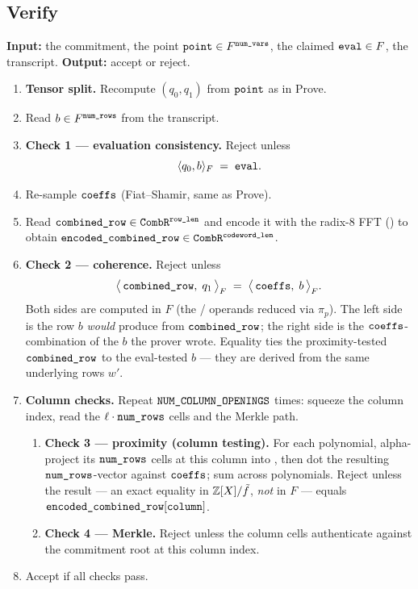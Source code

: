 \subsection{Verify}
\label{sec:verify}

\textbf{Input:} the commitment, the point
$\texttt{point} \in F^{\texttt{num\_vars}}$, the claimed
$\texttt{eval} \in F$, the transcript. \textbf{Output:} accept or
reject.

\begin{enumerate}
  \item \textbf{Tensor split.} Recompute $(q_0, q_1)$ from
    $\texttt{point}$ as in Prove.
  \item Read $b \in F^{\texttt{num\_rows}}$ from the transcript.
  \item \textbf{Check 1 --- evaluation consistency.} Reject unless
    \[
      \langle q_0, b\rangle_F \;=\; \texttt{eval}.
    \]
  \item Re-sample $\texttt{coeffs}$ (Fiat--Shamir, same as Prove).
  \item Read $\texttt{combined\_row} \in \texttt{CombR}^{\texttt{row\_len}}$
    and encode it with the radix-8 FFT () to obtain
    $\texttt{encoded\_combined\_row} \in
    \texttt{CombR}^{\texttt{codeword\_len}}$.
  \item \textbf{Check 2 --- coherence.} Reject unless
    \[
      \bigl\langle\, \texttt{combined\_row},\; q_1 \,\bigr\rangle_F
      \;=\;
      \bigl\langle\, \texttt{coeffs},\; b \,\bigr\rangle_F.
    \]
    Both sides are computed in $F$ (the  / 
    operands reduced via $\pi_p$). The left side is the row $b$
    \emph{would} produce from $\texttt{combined\_row}$; the right side
    is the $\texttt{coeffs}$-combination of the $b$ the prover wrote.
    Equality ties the proximity-tested $\texttt{combined\_row}$ to the
    eval-tested $b$ --- they are derived from the same underlying
    rows $w'$.
  \item \textbf{Column checks.} Repeat
    $\texttt{NUM\_COLUMN\_OPENINGS}$ times: squeeze the column index,
    read the $\ell\cdot\texttt{num\_rows}$  cells and the
    Merkle path.
    \begin{enumerate}
      \item \textbf{Check 3 --- proximity (column testing).} For each
        polynomial, alpha-project its $\texttt{num\_rows}$ 
        cells at this column into , then dot the resulting
        $\texttt{num\_rows}$-vector against $\texttt{coeffs}$; sum across
        polynomials. Reject unless the result --- an exact equality in
        $\mathbb{Z}[X]/\tilde f$, \emph{not} in $F$ --- equals
        $\texttt{encoded\_combined\_row}[\texttt{column}]$.
      \item \textbf{Check 4 --- Merkle.} Reject unless the column
        cells authenticate against the commitment root at this
        column index.
    \end{enumerate}
  \item Accept if all checks pass.
\end{enumerate}

